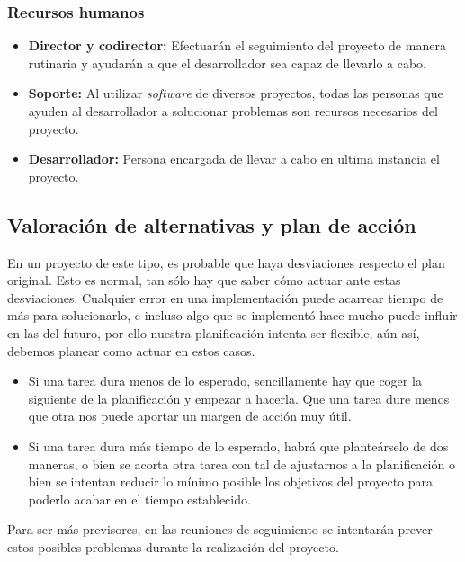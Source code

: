 \subsubsection{Recursos humanos}

\begin{itemize}
 \item \textbf{Director y codirector: } Efectuarán el seguimiento del proyecto de manera rutinaria y ayudarán a que el desarrollador sea capaz de llevarlo a cabo. 
 \item \textbf{Soporte: } Al utilizar \textit{software} de diversos proyectos, todas las personas que ayuden al desarrollador a solucionar problemas son recursos necesarios del proyecto.
 \item \textbf{Desarrollador: } Persona encargada de llevar a cabo en ultima instancia el proyecto.
\end{itemize}

\subsection{Valoración de alternativas y plan de acción}

En un proyecto de este tipo, es probable que haya desviaciones respecto el plan original. Esto es normal, tan sólo hay que saber cómo actuar ante estas desviaciones. Cualquier error en una implementación puede acarrear tiempo de más para solucionarlo, e incluso algo que se implementó hace mucho puede influir en las del futuro, por ello nuestra planificación intenta ser flexible, aún así, debemos planear como actuar en estos casos.

\begin{itemize}
 \item Si una tarea dura menos de lo esperado, sencillamente hay que coger la siguiente de la planificación y empezar a hacerla. Que una tarea dure menos que otra nos puede aportar un margen de acción muy útil.
 \item Si una tarea dura más tiempo de lo esperado, habrá que planteárselo de dos maneras, o bien se acorta otra tarea con tal de ajustarnos a la planificación o bien se intentan reducir lo mínimo posible los objetivos del proyecto para poderlo acabar en el tiempo establecido.
\end{itemize}

Para ser más previsores, en las reuniones de seguimiento se intentarán prever estos posibles problemas durante la realización del proyecto. 


















